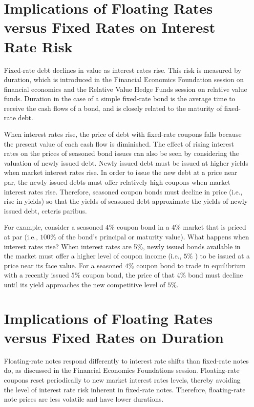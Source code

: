 \documentclass[11pt]{article}
\begin{document}
\section*{Implications of Floating Rates versus Fixed Rates on Interest Rate Risk}
Fixed-rate debt declines in value as interest rates rise. This risk is measured by duration, which is introduced in the Financial Economics Foundation session on financial economics and the Relative Value Hedge Funds session on relative value funds. Duration in the case of a simple fixed-rate bond is the average time to receive the cash flows of a bond, and is closely related to the maturity of fixed-rate debt.

When interest rates rise, the price of debt with fixed-rate coupons falls because the present value of each cash flow is diminished. The effect of rising interest rates on the prices of seasoned bond issues can also be seen by considering the valuation of newly issued debt. Newly issued debt must be issued at higher yields when market interest rates rise. In order to issue the new debt at a price near par, the newly issued debts must offer relatively high coupons when market interest rates rise. Therefore, seasoned coupon bonds must decline in price (i.e., rise in yields) so that the yields of seasoned debt approximate the yields of newly issued debt, ceteris paribus.

For example, consider a seasoned $4 \%$ coupon bond in a $4 \%$ market that is priced at par (i.e., $100 \%$ of the bond's principal or maturity value). What happens when interest rates rise? When interest rates are 5\%, newly issued bonds available in the market must offer a higher level of coupon income (i.e., $5 \%$ ) to be issued at a price near its face value. For a seasoned $4 \%$ coupon bond to trade in equilibrium with a recently issued $5 \%$ coupon bond, the price of that $4 \%$ bond must decline until its yield approaches the new competitive level of $5 \%$.

\section*{Implications of Floating Rates versus Fixed Rates on Duration}
Floating-rate notes respond differently to interest rate shifts than fixed-rate notes do, as discussed in the Financial Economics Foundations session. Floating-rate coupons reset periodically to new market interest rates levels, thereby avoiding the level of interest rate risk inherent in fixed-rate notes. Therefore, floating-rate note prices are less volatile and have lower durations.
\end{document}
